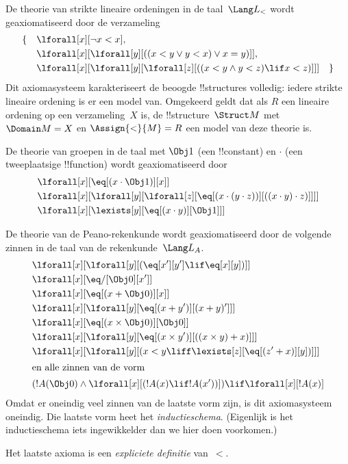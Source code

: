 \documentclass[../../../include/open-logic-section]{subfiles}
\begin{document}


\begin{ex}
De theorie van strikte lineaire ordeningen in de taal~$\Lang L_<$
wordt geaxiomatiseerd door de verzameling
\begin{align*}
\{\quad & \lforall[x][\lnot x < x], \\
& \lforall[x][\lforall[y][((x < y \lor y <
    x) \lor x = y)]], \\
& \lforall[x][\lforall[y][\lforall[z][((x < y
      \land y < z) \lif x < z)]]] \quad \}
\end{align*}
Dit axiomasysteem karakteriseert de beoogde !!{structure}s volledig:
iedere strikte lineaire ordening is er een model van. Omgekeerd geldt
dat als $R$ een lineaire ordening op een verzameling~$X$ is, de
!!{structure}~$\Struct M$ met $\Domain M = X$ en
$\Assign{<}{M} = R$ een model van deze theorie is.
\end{ex}

\begin{ex}
De theorie van groepen in de taal met $\Obj 1$ (een !!{constant}) en
$\cdot$ (een tweeplaatsige !!{function}) wordt geaxiomatiseerd door
\begin{align*}
& \lforall[x][\eq[(x \cdot \Obj 1)][x]]\\
& \lforall[x][\lforall[y][\lforall[z][\eq[(x \cdot (y \cdot z))][((x
          \cdot y) \cdot z)]]]]\\
& \lforall[x][\lexists[y][\eq[(x \cdot y)][\Obj 1]]]
\end{align*}
\end{ex}

\begin{ex}
De theorie van de Peano-rekenkunde wordt geaxiomatiseerd door de
volgende zinnen in de taal van de rekenkunde~$\Lang L_A$.
\begin{align*}
& \lforall[x][\lforall[y][(\eq[x'][y'] \lif \eq[x][y])]]\\
& \lforall[x][\eq/[\Obj 0][x']]\\
& \lforall[x][\eq[(x + \Obj 0)][x]]\\
& \lforall[x][\lforall[y][\eq[(x + y')][(x + y)']]]\\
& \lforall[x][\eq[(x \times \Obj 0)][\Obj 0]]\\
& \lforall[x][\lforall[y][\eq[(x \times y')][((x \times y) + x)]]]\\
& \lforall[x][\lforall[y][(x < y \liff \lexists[z][\eq[(z' + x)][y])]]]\\
\intertext{en alle zinnen van de vorm}
& (!A(\Obj 0) \land \lforall[x][(!A(x) \lif !A(x'))]) \lif \lforall[x][!A(x)]
\end{align*}
Omdat er oneindig veel zinnen van de laatste vorm zijn, is dit
axiomasysteem oneindig. Die laatste vorm heet het
\emph{inductieschema}. (Eigenlijk is het inductieschema iets
ingewikkelder dan we hier doen voorkomen.)

Het laatste axioma is een \emph{expliciete definitie} van~$<$.
\end{ex}
\end{document}
